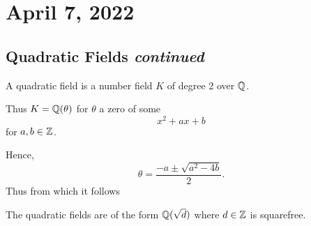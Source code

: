 \section{April 7, 2022}
\subsection{Quadratic Fields \emph{continued}}

\begin{definition*}
    A quadratic field is a number field $K$ of degree $2$ over $\mathbb Q$.

    Thus $K = \mathbb Q(\theta)$ for $\theta$ a zero of some
    \[x^2 + ax + b\]
    for $a, b\in\mathbb Z$.
\end{definition*}
Hence,
\[\theta = \frac{-a\pm \sqrt{a^2 - 4b}}{2}.\]
Thus from which it follows
\begin{proposition*}
    The quadratic fields are of the form $\mathbb Q(\sqrt{d})$ where $d\in\mathbb Z$ is squarefree.
\end{proposition*}

